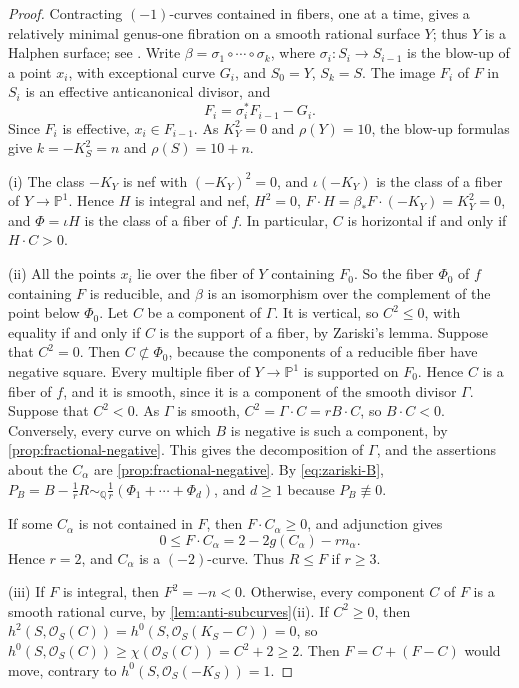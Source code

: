 \documentclass[11pt,reqno]{amsart}
\numberwithin{equation}{section}
\theoremstyle{remark}
\newcommand{\sshf}[1]{\mathcal{O}_{#1}}
\newcommand{\prj}[1]{\mathbb{P}^{#1}}
\begin{document}
\begin{proof}
Contracting \((-1)\)-curves contained in fibers, one at a time, gives a relatively minimal genus-one fibration on a smooth rational surface \(Y\); thus \(Y\) is a Halphen surface; see \cite[Section~2.2]{CantatDolgachev}. Write \(\beta=\sigma_1\circ\cdots\circ\sigma_k\), where \(\sigma_i\colon S_i\to S_{i-1}\) is the blow-up of a point \(x_i\), with exceptional curve \(G_i\), and \(S_0=Y\), \(S_k=S\). The image \(F_i\) of \(F\) in \(S_i\) is an effective anticanonical divisor, and
\[
 F_i=\sigma_i^*F_{i-1}-G_i.
\]
Since \(F_i\) is effective, \(x_i\in F_{i-1}\). As \(K_Y^2=0\) and \(\rho(Y)=10\), the blow-up formulas give \(k=-K_S^2=n\) and \(\rho(S)=10+n\).

(i) The class \(-K_Y\) is nef with \((-K_Y)^2=0\), and \(\iota(-K_Y)\) is the class of a fiber of \(Y\to\prj{1}\). Hence \(H\) is integral and nef, \(H^2=0\), \(F\cdot H=\beta_*F\cdot(-K_Y)=K_Y^2=0\), and \(\Phi=\iota H\) is the class of a fiber of \(f\). In particular, \(C\) is horizontal if and only if \(H\cdot C>0\).

(ii) All the points \(x_i\) lie over the fiber of \(Y\) containing \(F_0\). So the fiber \(\Phi_0\) of \(f\) containing \(F\) is reducible, and \(\beta\) is an isomorphism over the complement of the point below \(\Phi_0\). Let \(C\) be a component of \(\Gamma\). It is vertical, so \(C^2\leq0\), with equality if and only if \(C\) is the support of a fiber, by Zariski's lemma. Suppose that \(C^2=0\). Then \(C\not\subset\Phi_0\), because the components of a reducible fiber have negative square. Every multiple fiber of \(Y\to\prj{1}\) is supported on \(F_0\). Hence \(C\) is a fiber of \(f\), and it is smooth, since it is a component of the smooth divisor \(\Gamma\). Suppose that \(C^2<0\). As \(\Gamma\) is smooth, \(C^2=\Gamma\cdot C=rB\cdot C\), so \(B\cdot C<0\). Conversely, every curve on which \(B\) is negative is such a component, by \cref{prop:fractional-negative}. This gives the decomposition of \(\Gamma\), and the assertions about the \(C_\alpha\) are \cref{prop:fractional-negative}. By \eqref{eq:zariski-B}, \(P_B=B-\frac1rR\sim_{\mathbb Q}\frac1r(\Phi_1+\cdots+\Phi_d)\), and \(d\geq1\) because \(P_B\not\equiv0\).

If some \(C_\alpha\) is not contained in \(F\), then \(F\cdot C_\alpha\geq0\), and adjunction gives
\[
 0\leq F\cdot C_\alpha=2-2g(C_\alpha)-rn_\alpha.
\]
Hence \(r=2\), and \(C_\alpha\) is a \((-2)\)-curve. Thus \(R\leq F\) if \(r\geq3\).

(iii) If \(F\) is integral, then \(F^2=-n<0\). Otherwise, every component \(C\) of \(F\) is a smooth rational curve, by \cref{lem:anti-subcurves}\textup{(ii)}. If \(C^2\geq0\), then \(h^2(S,\sshf{S}(C))=h^0(S,\sshf{S}(K_S-C))=0\), so \(h^0(S,\sshf{S}(C))\geq\chi(\sshf{S}(C))=C^2+2\geq2\). Then \(F=C+(F-C)\) would move, contrary to \(h^0(S,\sshf{S}(-K_S))=1\).


\end{proof}
\end{document}

